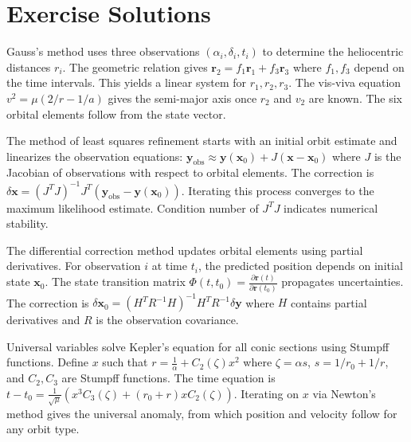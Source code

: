 \section{Exercise Solutions}

\begin{solution}
Gauss's method uses three observations $(\alpha_i, \delta_i, t_i)$ to determine the heliocentric distances $r_i$. The geometric relation gives $\mathbf{r}_2 = f_1\mathbf{r}_1 + f_3\mathbf{r}_3$ where $f_1, f_3$ depend on the time intervals. This yields a linear system for $r_1, r_2, r_3$. The vis-viva equation $v^2 = \mu(2/r - 1/a)$ gives the semi-major axis once $r_2$ and $v_2$ are known. The six orbital elements follow from the state vector.
\end{solution}

\begin{solution}
The method of least squares refinement starts with an initial orbit estimate and linearizes the observation equations: $\mathbf{y}_{\text{obs}} \approx \mathbf{y}(\mathbf{x}_0) + J(\mathbf{x} - \mathbf{x}_0)$ where $J$ is the Jacobian of observations with respect to orbital elements. The correction is $\delta\mathbf{x} = (J^T J)^{-1} J^T (\mathbf{y}_{\text{obs}} - \mathbf{y}(\mathbf{x}_0))$. Iterating this process converges to the maximum likelihood estimate. Condition number of $J^T J$ indicates numerical stability.
\end{solution}

\begin{solution}
The differential correction method updates orbital elements using partial derivatives. For observation $i$ at time $t_i$, the predicted position depends on initial state $\mathbf{x}_0$. The state transition matrix $\Phi(t, t_0) = \frac{\partial \mathbf{r}(t)}{\partial \mathbf{r}(t_0)}$ propagates uncertainties. The correction is $\delta\mathbf{x}_0 = (H^T R^{-1} H)^{-1} H^T R^{-1} \delta\mathbf{y}$ where $H$ contains partial derivatives and $R$ is the observation covariance.
\end{solution}

\begin{solution}
Universal variables solve Kepler's equation for all conic sections using Stumpff functions. Define $x$ such that $r = \frac{1}{\alpha} + C_2(\zeta)x^2$ where $\zeta = \alpha s$, $s = 1/r_0 + 1/r$, and $C_2, C_3$ are Stumpff functions. The time equation is $t - t_0 = \frac{1}{\sqrt{\mu}}(x^3 C_3(\zeta) + (r_0+r)x C_2(\zeta))$. Iterating on $x$ via Newton's method gives the universal anomaly, from which position and velocity follow for any orbit type.
\end{solution}
